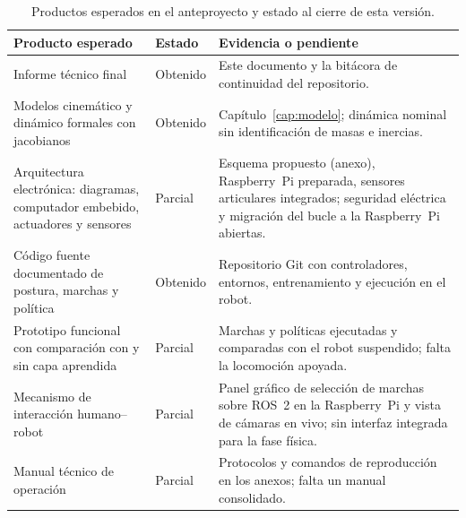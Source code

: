 \begin{table}[H]
\centering
\small
\caption{Productos esperados en el anteproyecto y estado al cierre de esta versión.}
\label{tab:productos-anteproyecto}
\begin{tabular}{>{\raggedright\arraybackslash}p{}p{}>{\raggedright\arraybackslash}p{}}
\toprule
\textbf{Producto esperado} & \textbf{Estado} & \textbf{Evidencia o pendiente} \\
\midrule
Informe técnico final & Obtenido & Este documento y la bitácora de continuidad del repositorio. \\
Modelos cinemático y dinámico formales con jacobianos & Obtenido & Capítulo~\ref{cap:modelo}; dinámica nominal sin identificación de masas e inercias. \\
Arquitectura electrónica: diagramas, computador embebido, actuadores y sensores & Parcial & Esquema propuesto (anexo), Raspberry~Pi preparada, sensores articulares integrados; seguridad eléctrica y migración del bucle a la Raspberry~Pi abiertas. \\
Código fuente documentado de postura, marchas y política & Obtenido & Repositorio Git con controladores, entornos, entrenamiento y ejecución en el robot. \\
Prototipo funcional con comparación con y sin capa aprendida & Parcial & Marchas y políticas ejecutadas y comparadas con el robot suspendido; falta la locomoción apoyada. \\
Mecanismo de interacción humano--robot & Parcial & Panel gráfico de selección de marchas sobre ROS~2 en la Raspberry~Pi y vista de cámaras en vivo; sin interfaz integrada para la fase física. \\
Manual técnico de operación & Parcial & Protocolos y comandos de reproducción en los anexos; falta un manual consolidado. \\
\bottomrule
\end{tabular}
\end{table}
